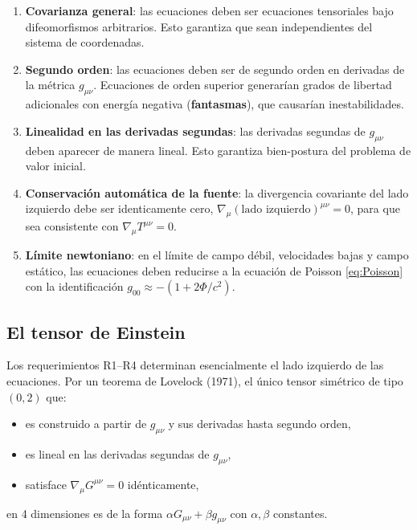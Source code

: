 \begin{enumerate}[leftmargin=2em, label=\textbf{R\arabic*.}]
  \item \textbf{Covarianza general}: las ecuaciones deben ser ecuaciones tensoriales bajo difeomorfismos arbitrarios. Esto garantiza que sean independientes del sistema de coordenadas.

  \item \textbf{Segundo orden}: las ecuaciones deben ser de segundo orden en derivadas de la métrica $g_{\mu\nu}$. Ecuaciones de orden superior generarían grados de libertad adicionales con energía negativa (\textbf{fantasmas}), que causarían inestabilidades.

  \item \textbf{Linealidad en las derivadas segundas}: las derivadas segundas de $g_{\mu\nu}$ deben aparecer de manera lineal. Esto garantiza bien-postura del problema de valor inicial.

  \item \textbf{Conservación automática de la fuente}: la divergencia covariante del lado izquierdo debe ser identicamente cero, $\nabla_\mu(\text{lado izquierdo})^{\mu\nu} = 0$, para que sea consistente con $\nabla_\mu T^{\mu\nu} = 0$.

  \item \textbf{Límite newtoniano}: en el límite de campo débil, velocidades bajas y campo estático, las ecuaciones deben reducirse a la ecuación de Poisson \eqref{eq:Poisson} con la identificación $g_{00} \approx -(1 + 2\Phi/c^2)$.
\end{enumerate}

\subsection{El tensor de Einstein}

Los requerimientos R1--R4 determinan esencialmente el lado izquierdo de las ecuaciones. Por un teorema de Lovelock (1971), el único tensor simétrico de tipo $(0,2)$ que:
\begin{itemize}[leftmargin=2em]
  \item es construido a partir de $g_{\mu\nu}$ y sus derivadas hasta segundo orden,
  \item es lineal en las derivadas segundas de $g_{\mu\nu}$,
  \item satisface $\nabla_\mu G^{\mu\nu} = 0$ idénticamente,
\end{itemize}
en 4 dimensiones es de la forma $\alpha G_{\mu\nu} + \beta g_{\mu\nu}$ con $\alpha, \beta$ constantes.

